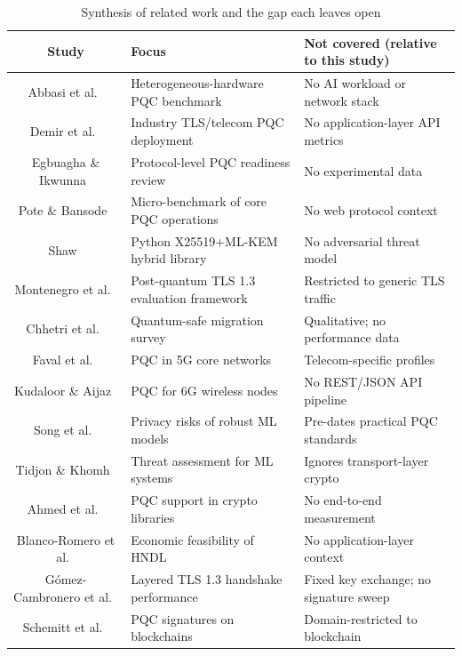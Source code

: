 \documentclass[conference]{IEEEtran}
\begin{document}
\begin{table}[t]
\caption{Synthesis of related work and the gap each leaves open}
\label{tab:related_work}
\centering
\begin{tabular}{|c|p{5.8cm}|p{6.9cm}|}
\hline
\textbf{Study} & \textbf{Focus} & \textbf{Not covered (relative to this study)} \\
\hline
Abbasi et al.~\cite{abbasi2025benchmark} & Heterogeneous-hardware PQC benchmark & No AI workload or network stack \\
\hline
Demir et al.~\cite{demir2025industry} & Industry TLS/telecom PQC deployment & No application-layer API metrics \\
\hline
Egbuagha \& Ikwunna~\cite{egbuagha2025practice} & Protocol-level PQC readiness review & No experimental data \\
\hline
Pote \& Bansode~\cite{pote2025evaluation} & Micro-benchmark of core PQC operations & No web protocol context \\
\hline
Shaw~\cite{shaw2026quantumsafe} & Python X25519+ML-KEM hybrid library & No adversarial threat model \\
\hline
Montenegro et al.~\cite{montenegro2026framework} & Post-quantum TLS 1.3 evaluation framework & Restricted to generic TLS traffic \\
\hline
Chhetri et al.~\cite{chhetri2025survey} & Quantum-safe migration survey & Qualitative; no performance data \\
\hline
Faval et al.~\cite{faval2026mobile} & PQC in 5G core networks & Telecom-specific profiles \\
\hline
Kudaloor \& Aijaz~\cite{kudaloor2026sixg} & PQC for 6G wireless nodes & No REST/JSON API pipeline \\
\hline
Song et al.~\cite{song2019privacy} & Privacy risks of robust ML models & Pre-dates practical PQC standards \\
\hline
Tidjon \& Khomh~\cite{tidjon2022threat} & Threat assessment for ML systems & Ignores transport-layer crypto \\
\hline
Ahmed et al.~\cite{ahmed2025libraries} & PQC support in crypto libraries & No end-to-end measurement \\
\hline
Blanco-Romero et al.~\cite{blancoromero2026hndl} & Economic feasibility of HNDL & No application-layer context \\
\hline
G\'omez-Cambronero et al.~\cite{gomezcambronero2026layered} & Layered TLS 1.3 handshake performance & Fixed key exchange; no signature sweep \\
\hline
Schemitt et al.~\cite{schemitt2025blockchain} & PQC signatures on blockchains & Domain-restricted to blockchain \\
\hline
\end{tabular}
\end{table}
\end{document}
